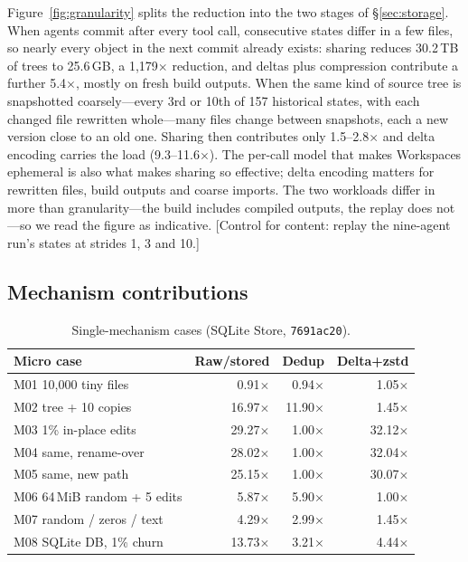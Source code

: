 \documentclass[letterpaper,twocolumn,10pt]{article}
\newif\ifdraft\drafttrue
\newcommand{\dnote}[1]{\ifdraft\textcolor{red!70!black}{\textsf{\small[#1]}}\fi}
\newcommand{\ws}{Workspace}
\newcommand{\X}{$\times$}
\begin{document}
Figure~\ref{fig:granularity} splits the reduction into the two stages of
\S\ref{sec:storage}. When agents commit after every tool call, consecutive
states differ in a few files, so nearly every object in the next commit
already exists: sharing reduces 30.2\,TB of trees to 25.6\,GB, a 1,179\X{}
reduction, and deltas plus compression contribute a further 5.4\X{}, mostly
on fresh build outputs. When the same kind of source tree is snapshotted
coarsely---every 3rd or 10th of 157 historical states, with each changed
file rewritten whole---many files change between snapshots, each a new
version close to an old one. Sharing then contributes only 1.5--2.8\X{} and
delta encoding carries the load (9.3--11.6\X). The per-call model that makes
\ws{}s ephemeral is also what makes sharing so effective; delta encoding
matters for rewritten files, build outputs and coarse imports. The two
workloads differ in more than granularity---the build includes compiled
outputs, the replay does not---so we read the figure as indicative.
\dnote{Control for content: replay the nine-agent run's states at strides
1, 3 and 10.}

\subsection{Mechanism contributions}
\label{sec:eval-mech}

\begin{table}[t]
\centering
\small
\setlength{\tabcolsep}{3pt}
\begin{tabular}{l r r r}
\toprule
Micro case & Raw/stored & Dedup & Delta+zstd \\
\midrule
M01 10,000 tiny files        & 0.91\X & 0.94\X & 1.05\X \\
M02 tree + 10 copies         & 16.97\X & 11.90\X & 1.45\X \\
M03 1\% in-place edits       & 29.27\X & 1.00\X & 32.12\X \\
M04 same, rename-over        & 28.02\X & 1.00\X & 32.04\X \\
M05 same, new path           & 25.15\X & 1.00\X & 30.07\X \\
M06 64\,MiB random + 5 edits & 5.87\X & 5.90\X & 1.00\X \\
M07 random / zeros / text    & 4.29\X & 2.99\X & 1.45\X \\
M08 SQLite DB, 1\% churn     & 13.73\X & 3.21\X & 4.44\X \\
\bottomrule
\end{tabular}
\caption{Single-mechanism cases (SQLite Store, \texttt{7691ac20}).}
\label{tab:micro}
\end{table}
\end{document}
